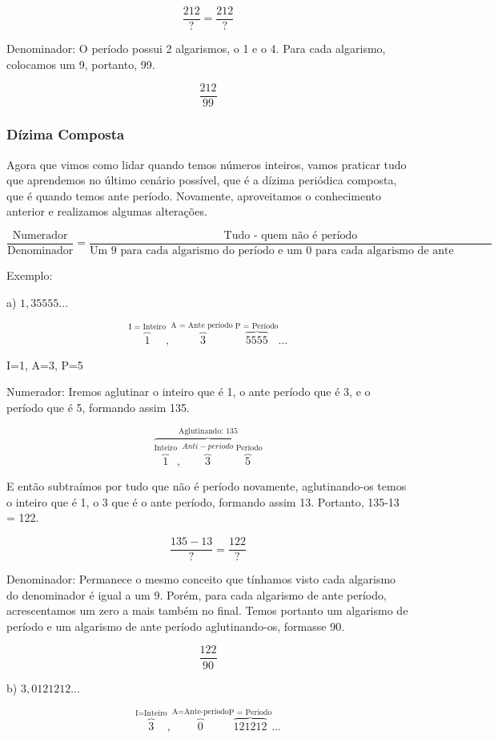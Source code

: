 \documentclass[letterpaper]{book}
\begin{document}
\[\dfrac{212}{?} = \dfrac{212}{?}\]

Denominador: O período possui 2 algarismos, o 1 e o 4. Para cada algarismo, colocamos um 9, portanto, 99.

\[\dfrac{212}{99}\]

\subsubsection{Dízima Composta}

Agora que vimos como lidar quando temos números inteiros, vamos praticar tudo que aprendemos no último cenário possível, que é a dízima periódica composta, que é quando temos ante período. Novamente, aproveitamos o conhecimento anterior e realizamos algumas alterações.

\[\dfrac{\text{Numerador}}{\text{Denominador}} = \dfrac{\text{Tudo - quem não é período}}{\text{Um 9 para cada algarismo do período e um 0 para cada algarismo de ante período }}\]

Exemplo:

a) \(1,35555...\)

\[\overbrace{1}^{\text{I = Inteiro}},\overbrace{3}^{\text{A = Ante período }}\overbrace{5555}^{\text{P = Período}}\ldots\]

I=1, A=3, P=5

Numerador: Iremos aglutinar o inteiro que é 1, o ante período que é 3, e o período que é 5, formando assim 135.

\[\overbrace{\overbrace{1}^{\text{Inteiro}},\overbrace{3}^{Anti-periodo }\overbrace{5}^{\text{ Período}}}^{\text{Aglutinando: }135}\]

E então subtraímos por tudo que não é período novamente, aglutinando-os temos o inteiro que é 1, o 3 que é o ante período, formando assim 13. Portanto, 135-13 = 122.

\[\dfrac{135-13}{?} = \dfrac{122}{?}\]

Denominador: Permanece o mesmo conceito que tínhamos visto cada algarismo do denominador é igual a um 9. Porém, para cada algarismo de ante período, acrescentamos um zero a mais também no final. Temos portanto um algarismo de período e um algarismo de ante período aglutinando-os, formasse 90.

\[\dfrac{122}{90}\]

b) \(3,0121212...\)

\[\overbrace{3}^{\text{I=Inteiro}},\overbrace{0}^{\text{A=Ante-periodo}}\overbrace{121212}^{\text{P = Periodo}}\ldots\]
\end{document}

